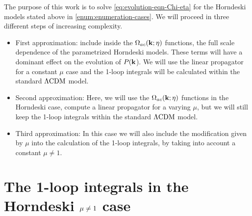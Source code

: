 The purpose of this work is to solve \cref{eq:evolution-eqn-Chi-eta}
for the Horndeski models stated above in \cref{enum:enumeration-cases}.
We will proceed in three different steps of increasing complexity.
\begin{itemize}
	\item First approximation: include inside the $\Omega_{ac}(\mathbf{k};\eta)$ functions, the
	full scale dependence of the parametrized Horndeski models.
	These terms will have a dominant effect on the evolution of $P(\mathbf{k}$).
	We will use the linear propagator for a constant $\mu$ case
	and the 1-loop integrals will be calculated within the standard $\Lambda\mathrm{CDM}$
	model.
	\item Second approximation: Here, we will use the $\Omega_{ac}(\mathbf{k};\eta)$ functions in
	the Horndeski case, compute a linear propagator for a varying $\mu$, but we will still
	keep the 1-loop integrals within the standard $\Lambda\mathrm{CDM}$
	model.
	\item Third approximation: In this case we will also include 
	the modification given by $\mu$ into the calculation of the 1-loop integrals, by taking
	into account a constant $\mu \neq 1$.
\end{itemize}
%


\section{The 1-loop integrals in the Horndeski $\mu\protect\neq1$ case}



